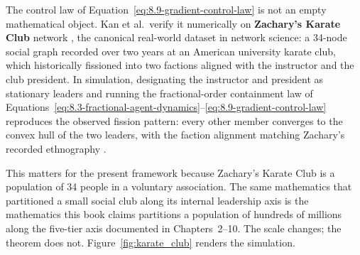 The control law of Equation~\ref{eq:8.9-gradient-control-law} is not an empty mathematical object. Kan et al.\ verify it numerically on \textbf{Zachary's Karate Club} network \cite{zachary1977}, the canonical real-world dataset in network science: a 34-node social graph recorded over two years at an American university karate club, which historically fissioned into two factions aligned with the instructor and the club president. In simulation, designating the instructor and president as stationary leaders and running the fractional-order containment law of Equations~\ref{eq:8.3-fractional-agent-dynamics}--\ref{eq:8.9-gradient-control-law} reproduces the observed fission pattern: every other member converges to the convex hull of the two leaders, with the faction alignment matching Zachary's recorded ethnography \cite{kan_containment}.

This matters for the present framework because Zachary's Karate Club is a population of 34 people in a voluntary association. The same mathematics that partitioned a small social club along its internal leadership axis is the mathematics this book claims partitions a population of hundreds of millions along the five-tier axis documented in Chapters~2--10. The scale changes; the theorem does not. Figure~\ref{fig:karate_club} renders the simulation.

